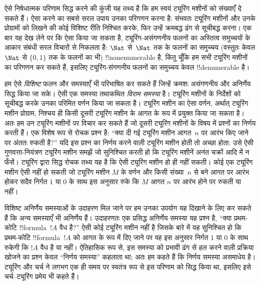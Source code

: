 \documentclass[../../../include/open-logic-section]{subfiles}
\begin{document}
ऐसे निषेधात्मक परिणाम सिद्ध करने की कुंजी यह तथ्य है कि हम स्वयं
ट्यूरिंग मशीनों को संख्याएँ दे सकते हैं। ऐसा करने का सबसे सरल उपाय उनका
परिगणन करना है: संभवतः ट्यूरिंग मशीनों और उनके प्रोग्रामों को लिखने की
कोई विशिष्ट रीति निश्चित करके, फिर उन्हें क्रमबद्ध ढंग से सूचीबद्ध
करना। एक बार यह देख लेने पर कि ऐसा किया जा सकता है, ट्यूरिंग-असंगणनीय
फलनों का अस्तित्व समुच्चयों के आकार संबंधी सरल विचारों से निकलता है:
$\Nat$ से~$\Nat$ तक के फलनों का समुच्चय (वस्तुतः केवल $\Nat$ से
$\{0, 1\}$ तक के फलनों का भी) !!{nonenumerable} है, किंतु चूँकि हम सभी
ट्यूरिंग मशीनों का परिगणन कर सकते हैं, इसलिए ट्यूरिंग-संगणनीय फलनों का
समुच्चय केवल !!{denumerable} है।

हम ऐसे \emph{विशिष्ट} फलन और समस्याएँ भी परिभाषित कर सकते हैं जिन्हें
क्रमशः असंगणनीय और अनिर्णेय सिद्ध किया जा सके। ऐसी एक समस्या तथाकथित
\emph{विराम समस्या} है। ट्यूरिंग मशीनों के निर्देशों को सूचीबद्ध करके
उनका परिमित वर्णन किया जा सकता है। ट्यूरिंग मशीन का ऐसा वर्णन, अर्थात्
ट्यूरिंग मशीन प्रोग्राम, निश्चय ही किसी दूसरी ट्यूरिंग मशीन के आगत के
रूप में प्रयुक्त किया जा सकता है। अतः हम उन ट्यूरिंग मशीनों पर विचार कर
सकते हैं जो दूसरी ट्यूरिंग मशीनों के विषय में प्रश्नों का निर्णय करती
हैं। एक विशेष रूप से रोचक प्रश्न है: ``क्या दी गई ट्यूरिंग मशीन आगत~$n$
पर आरंभ किए जाने पर अंततः रुकती है?'' यदि इस प्रश्न का निर्णय करने वाली
ट्यूरिंग मशीन होती तो अच्छा होता: उसे ऐसी गुणवत्ता-नियंत्रण ट्यूरिंग
मशीन समझें जो सुनिश्चित करती हो कि ट्यूरिंग मशीनें अनंत चक्रों आदि में
न फँसें। ट्यूरिंग द्वारा सिद्ध रोचक तथ्य यह है कि ऐसी ट्यूरिंग मशीन हो
ही नहीं सकती। कोई एक ट्यूरिंग मशीन ऐसी नहीं हो सकती जो ट्यूरिंग मशीन
$M$ के वर्णन और किसी संख्या~$n$ से बने आगत पर आरंभ होकर सदैव निर्गत $1$
या $0$ के साथ इस अनुसार रुके कि $M$ आगत $n$ पर आरंभ होने पर रुकती या
नहीं।

विशिष्ट अनिर्णेय समस्याओं के उदाहरण मिल जाने पर हम उनका उपयोग यह दिखाने
के लिए कर सकते हैं कि अन्य समस्याएँ भी अनिर्णेय हैं। उदाहरणतः एक प्रसिद्ध
अनिर्णेय समस्या यह प्रश्न है, ``क्या प्रथम-कोटि !!{formula}~$!A$ वैध
है?'' ऐसी कोई ट्यूरिंग मशीन नहीं है जिसके बारे में यह सुनिश्चित हो कि
प्रथम-कोटि !!{formula}~$!A$ को आगत के रूप में दिए जाने पर वह इस अनुसार
निर्गत $1$ या $0$ के साथ रुकेगी कि $!A$ वैध है या नहीं। ऐतिहासिक रूप
से, इस समस्या को प्रभावी ढंग से हल करने वाली प्रक्रिया खोजने का प्रश्न
केवल ``निर्णय समस्या'' कहलाता था; अतः हम कहते हैं कि निर्णय समस्या
असमाधेय है। ट्यूरिंग और चर्च ने लगभग एक ही समय पर स्वतंत्र रूप से इस
परिणाम को सिद्ध किया था, इसलिए इसे चर्च--ट्यूरिंग प्रमेय भी कहते हैं।
\end{document}
